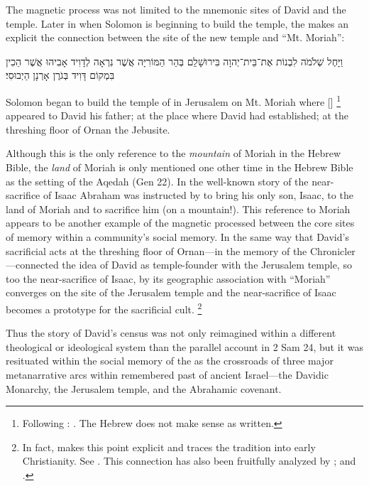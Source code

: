 The magnetic process was not limited to the mnemonic sites of David and the temple. Later in \chronicles when Solomon is beginning to build the temple, the \chronicler makes an explicit the connection between the site of the new temple and ``Mt. Moriah'':
\begin{hebrewtext}
    וַיָּחֶל שְׁלֹמֹה לִבְנוֹת אֶת־בֵּית־יְהוָה בִּירוּשָׁלִַם בְּהַר הַמּוֹרִיָּה אֲשֶׁר נִרְאָה לְדָוִיד אָבִיהוּ אֲשֶׁר הֵכִין בִּמְקוֹם דָּוִיד בְּגֹרֶן אָרְנָן הַיְבוּסִי׃
\end{hebrewtext}
\begin{translation}
    Solomon began to build the temple of \yahweh in Jerusalem on Mt. Moriah where [\yahweh]%
        \footnote{Following \lxx: 
        .
        The Hebrew does not make sense as written.}
    appeared to David his father;
    at the place where David had established; 
    at the threshing floor of Ornan the Jebusite.
\end{translation}
\noindent
Although this is the only reference to the \emph{mountain} of Moriah in the Hebrew Bible, the \emph{land} of Moriah is only mentioned one other time in the Hebrew Bible as the setting of the Aqedah (Gen 22). In the well-known story of the near-sacrifice of Isaac Abraham was instructed by \yahweh to bring his only son, Isaac,  to the land of Moriah and to sacrifice him (on a mountain!). This reference to Moriah appears to be another example of the magnetic processed between the core sites of memory within a community's social memory. In the same way that David's sacrificial acts at the threshing floor of Ornan---in the memory of the Chronicler---connected the idea of David as temple-founder with the Jerusalem temple, so too the near-sacrifice of Isaac, by its geographic association with ``Moriah'' converges on the site of the Jerusalem temple and the near-sacrifice of Isaac becomes a prototype for the sacrificial cult.%
    \footnote{In fact, \vermes makes this point explicit and traces the tradition into early Christianity. See \cite[204--211]{vermes1961}. This connection has also been fruitfully analyzed by \cite{kalimi_htr1990}; \cite[190--191]{kalimi_jnes2009} and \cite{amit_brenner-polak2009}.}

Thus the story of David's census was not only reimagined within a different theological or ideological system than the parallel account in 2 Sam 24, but it was resituated within the social memory of the \chronicler as the crossroads of three major metanarrative arcs within remembered past of ancient Israel---the Davidic Monarchy, the Jerusalem temple, and the Abrahamic covenant.

